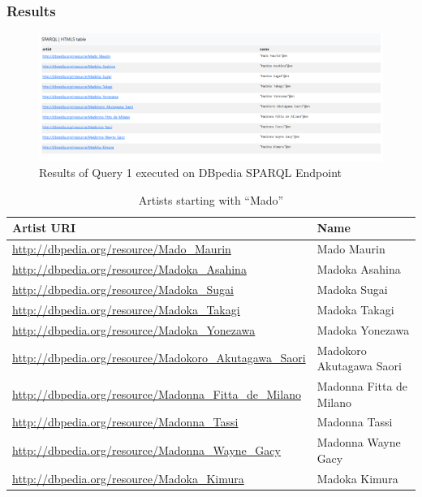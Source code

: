 \documentclass[12pt,a4paper]{article}
\begin{document}
\subsubsection{Results}

\begin{figure}[H]
    \centering
    \includegraphics[width=\textwidth]{screenshots/Query1.png}
    \caption{Results of Query 1 executed on DBpedia SPARQL Endpoint}
    \label{fig:query1_results}
\end{figure}

\begin{table}[H]
    \centering
    \caption{Artists starting with ``Mado''}
    \label{tab:query1_results}
    \begin{tabular}{|l|l|}
        \hline
        \textbf{Artist URI} & \textbf{Name} \\
        \hline
        \url{http://dbpedia.org/resource/Mado_Maurin} & Mado Maurin \\
        \url{http://dbpedia.org/resource/Madoka_Asahina} & Madoka Asahina \\
        \url{http://dbpedia.org/resource/Madoka_Sugai} & Madoka Sugai \\
        \url{http://dbpedia.org/resource/Madoka_Takagi} & Madoka Takagi \\
        \url{http://dbpedia.org/resource/Madoka_Yonezawa} & Madoka Yonezawa \\
        \url{http://dbpedia.org/resource/Madokoro_Akutagawa_Saori} & Madokoro Akutagawa Saori \\
        \url{http://dbpedia.org/resource/Madonna_Fitta_de_Milano} & Madonna Fitta de Milano \\
        \url{http://dbpedia.org/resource/Madonna_Tassi} & Madonna Tassi \\
        \url{http://dbpedia.org/resource/Madonna_Wayne_Gacy} & Madonna Wayne Gacy \\
        \url{http://dbpedia.org/resource/Madoka_Kimura} & Madoka Kimura \\
        \hline
    \end{tabular}
\end{table}
\end{document}

